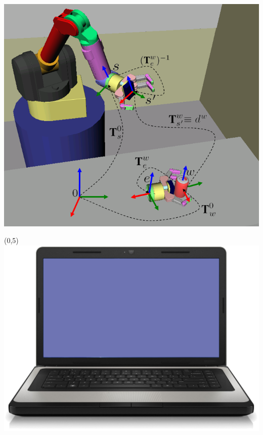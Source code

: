 \documentclass{beamer}
\begin{document}
\begin{frame}[plain]{}
\begin{textblock}{5}
                    \includegraphics[width=1.2\linewidth]{figures/pick_and_place.png}
                \end{textblock}                
          \begin{textblock}{5}(0,5)
              \includegraphics[width=0.6\linewidth]{figures/laptop.png}
            \end{textblock} 
            \end{frame}
        
\end{document}
